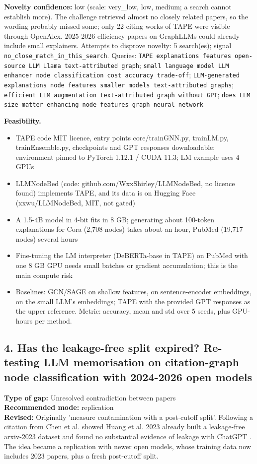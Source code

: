 \documentclass[11pt,a4paper]{article}
\begin{document}
\textbf{Novelty confidence:} low (scale: very\_low, low, medium; a search cannot establish more). The challenge retrieved almost no closely related papers, so the wording probably missed some; only 22 citing works of TAPE were visible through OpenAlex. 2025-2026 efficiency papers on GraphLLMs could already include small explainers.
Attempts to disprove novelty: 5 search(es); signal \texttt{no\_close\_match\_in\_this\_search}. Queries: \texttt{TAPE explanations features open-source LLM Llama text-attributed graph}; \texttt{small language model LLM enhancer node classification cost accuracy trade-off}; \texttt{LLM-generated explanations node features smaller models text-attributed graphs}; \texttt{efficient LLM augmentation text-attributed graph without GPT}; \texttt{does LLM size matter enhancing node features graph neural network}

\textbf{Feasibility.}
\begin{itemize}
\item [V] TAPE code MIT licence, entry points core/trainGNN.py, trainLM.py, trainEnsemble.py, checkpoints and GPT responses downloadable; environment pinned to PyTorch 1.12.1 / CUDA 11.3; LM example uses 4 GPUs
\item [V] LLMNodeBed (code: github.com/WxxShirley/LLMNodeBed, no licence found) implements TAPE, and its data is on Hugging Face (xxwu/LLMNodeBed, MIT, not gated)
\item [E] A 1.5-4B model in 4-bit fits in 8 GB; generating about 100-token explanations for Cora (2,708 nodes) takes about an hour, PubMed (19,717 nodes) several hours
\item [E] Fine-tuning the LM interpreter (DeBERTa-base in TAPE) on PubMed with one 8 GB GPU needs small batches or gradient accumulation; this is the main compute risk
\item [S] Baselines: GCN/SAGE on shallow features, on sentence-encoder embeddings, on the small LLM's embeddings; TAPE with the provided GPT responses as the upper reference. Metric: accuracy, mean and std over 5 seeds, plus GPU-hours per method.
\end{itemize}

\subsection{4. Has the leakage-free split expired? Re-testing LLM memorisation on citation-graph node classification with 2024-2026 open models}
\textbf{Type of gap:} Unresolved contradiction between papers\\
\textbf{Recommended mode:} replication\\
\textbf{Revised:} Originally 'measure contamination with a post-cutoff split'. Following a citation from Chen et al. showed Huang et al. 2023 already built a leakage-free arxiv-2023 dataset and found no substantial evidence of leakage with ChatGPT \cite{huang2023leakage}. The idea became a replication with newer open models, whose training data now includes 2023 papers, plus a fresh post-cutoff split.
\end{document}
